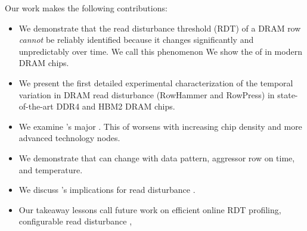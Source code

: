 Our work makes the following contributions:
\begin{itemize}
    \item We demonstrate that the read disturbance threshold (RDT) of a DRAM row
    \emph{cannot} be reliably
    identified because it changes significantly and unpredictably over time. We
    call this phenomenon \emph{}
    We show the  of \phenomenon{} in modern DRAM chips.
    \item We present the first detailed experimental characterization of the
    temporal variation in DRAM read disturbance (RowHammer and RowPress) in
    state-of-the-art DDR4 and HBM2 DRAM chip{s}. 

    \item We examine \phenomenon{}'s major . 
    This  of \phenomenon{} worsens with increasing chip
    density and more advanced technology nodes.
    \item We demonstrate that \phenomenon{} can change with data pattern,
    aggressor row on time, and temperature.
    \item We discuss \phenomenon{}'s implications for  read disturbance .
      
    \item Our takeaway lessons call
     future work on efficient online RDT profiling, configurable
    read disturbance , 
\end{itemize}